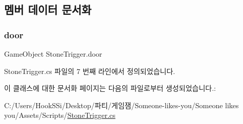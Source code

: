 \subsection{멤버 데이터 문서화}
\mbox{\label{class_stone_trigger_a1ca819ff116e4a5ce3d56fc7c973f3fc}} 
\subsubsection{\texorpdfstring{door}{door}}
{\footnotesize\ttfamily Game\+Object Stone\+Trigger.\+door}



Stone\+Trigger.\+cs 파일의 7 번째 라인에서 정의되었습니다.



이 클래스에 대한 문서화 페이지는 다음의 파일로부터 생성되었습니다.\+:\begin{DoxyCompactItemize}
\item 
C\+:/\+Users/\+Hook\+S\+Si/\+Desktop/파티/게임잼/\+Someone-\/likes-\/you/\+Someone likes you/\+Assets/\+Scripts/\mbox{\hyperlink{_stone_trigger_8cs}{Stone\+Trigger.\+cs}}\end{DoxyCompactItemize}

